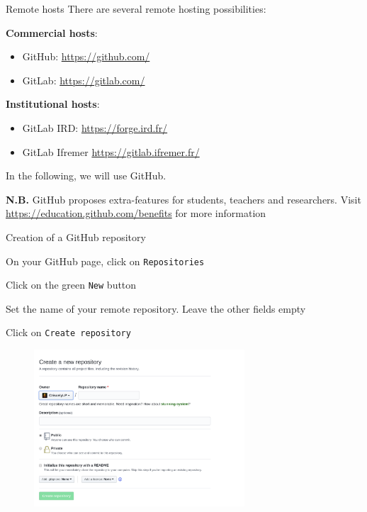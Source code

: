 \documentclass[10pt]{beamer}
\begin{document}
\begin{frame}{Remote hosts}
\protect\hypertarget{remote-hosts}{}
There are several remote hosting possibilities:

\textbf{Commercial hosts}:

\begin{itemize}
\item
  GitHub: \url{https://github.com/}
\item
  GitLab: \url{https://gitlab.com/}
\end{itemize}

\textbf{Institutional hosts}:

\begin{itemize}
\item
  GitLab IRD: \url{https://forge.ird.fr/}
\item
  GitLab Ifremer \url{https://gitlab.ifremer.fr/}
\end{itemize}

In the following, we will use GitHub.



\textbf{N.B. }GitHub proposes extra-features for students, teachers and researchers.
Visit \url{https://education.github.com/benefits} for more information

\end{frame}

\begin{frame}[fragile]{Creation of a GitHub repository}
\protect\hypertarget{creation-of-a-github-repository}{}

On your GitHub page, click on \texttt{Repositories}

Click on the green \texttt{New} button

Set the name of your remote repository. Leave the other fields empty

Click on \texttt{Create\ repository}


\begin{figure}

{\centering \includegraphics[width=0.7\textwidth]{img/github_makeRepo.png}

}

\end{figure}

\end{frame}
\end{document}
